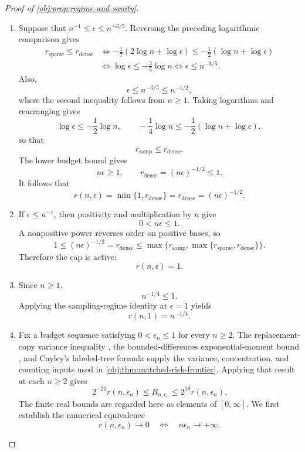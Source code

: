 \begin{proof}[Proof of \cref{obj:prop:regime-and-sanity}]
\begin{enumerate}
\item Suppose that \(n^{-1}\le\epsilon\le n^{-3/5}\).
Reversing the preceding logarithmic comparison gives
\[
\begin{aligned}
r_{\mathrm{sparse}}\le r_{\mathrm{dense}}
&\iff
-\frac17(2\log n+\log\epsilon)
\le-\frac12(\log n+\log\epsilon)\\
&\iff \log\epsilon\le-\frac35\log n
\iff \epsilon\le n^{-3/5}.
\end{aligned}
\]
Also,
\[
\epsilon\le n^{-3/5}\le n^{-1/2},
\]
where the second inequality follows from \(n\ge1\).
Taking logarithms and rearranging gives
\[
\log\epsilon\le-\frac12\log n,
\qquad
-\frac14\log n
\le-\frac12(\log n+\log\epsilon),
\]
so that
\[
r_{\mathrm{samp}}\le r_{\mathrm{dense}}.
\]
The lower budget bound gives
\[
n\epsilon\ge1,
\qquad
r_{\mathrm{dense}}=(n\epsilon)^{-1/2}\le1.
\]
It follows that
\[
r(n,\epsilon)
=\min\{1,r_{\mathrm{dense}}\}
=r_{\mathrm{dense}}
=(n\epsilon)^{-1/2}.
\]

\item If \(\epsilon\le n^{-1}\), then positivity and multiplication by \(n\) give
\[
0<n\epsilon\le1.
\]
A nonpositive power reverses order on positive bases, so
\[
1\le(n\epsilon)^{-1/2}
=r_{\mathrm{dense}}
\le\max\{r_{\mathrm{samp}},
             \max\{r_{\mathrm{sparse}},r_{\mathrm{dense}}\}\}.
\]
Therefore the cap is active:
\[
r(n,\epsilon)=1.
\]

\item Since \(n\ge1\),
\[
n^{-1/4}\le1.
\]
Applying the sampling-regime identity at \(\epsilon=1\) yields
\[
r(n,1)=n^{-1/4}.
\]

\item Fix a budget sequence satisfying \(0<\epsilon_n\le1\) for every \(n\ge2\).
The replacement-copy variance inequality
\citep[Theorem 3.1, printed p.~54]{BoucheronLugosiMassart2013},
the bounded-differences exponential-moment bound
\citep[Theorem 6.2, displayed log-mgf conclusion in its proof, printed p.~167]{BoucheronLugosiMassart2013},
and Cayley's labeled-tree formula
\citep[Section 5.6, Theorem 5.40]{KellerTrotterAppliedCombinatorics}
supply the variance, concentration, and counting inputs used in
\cref{obj:thm:matched-risk-frontier}. Applying that result at each \(n\ge2\) gives
\[
2^{-20}r(n,\epsilon_n)
\le R_{n,\epsilon_n}
\le2^{18}r(n,\epsilon_n).
\]
The finite real bounds are regarded here as elements of \([0,\infty]\).
We first establish the numerical equivalence
\[
r(n,\epsilon_n)\longrightarrow0
\quad\Longleftrightarrow\quad
n\epsilon_n\longrightarrow+\infty.
\]


\end{enumerate}
\end{proof}
